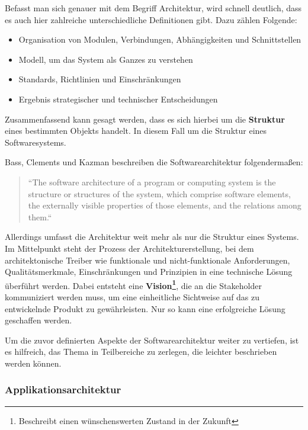 Befasst man sich genauer mit dem Begriff \glqq Architektur\grqq, wird schnell deutlich, dass es auch hier zahlreiche unterschiedliche Definitionen gibt. Dazu zählen Folgende:

\begin{itemize}
    \item Organisation von Modulen, Verbindungen, Abhängigkeiten und Schnittstellen
    \item Modell, um das System als Ganzes zu verstehen
    \item Standards, Richtlinien und Einschränkungen
    \item Ergebnis strategischer und technischer Entscheidungen
\end{itemize}

Zusammenfassend kann gesagt werden, dass es sich hierbei um die \textbf{Struktur} eines bestimmten Objekts handelt. In diesem Fall um die Struktur eines Softwaresystems. \cite{EA:Web01}

Bass, Clements und Kazman beschreiben die Softwarearchitektur folgendermaßen:

\begin{quote}
    ``The software architecture of a program or computing system is the structure or structures of the system, which comprise software elements, the externally visible properties of those elements, and the relations among them.`` \cite[S. 3]{EA:Book03}
\end{quote}

Allerdings umfasst die Architektur weit mehr als nur die Struktur eines Systems. 
Im Mittelpunkt steht der Prozess der Architekturerstellung, bei dem architektonische Treiber wie funktionale und nicht-funktionale Anforderungen, Qualitätsmerkmale, Einschränkungen und Prinzipien in eine technische Lösung überführt werden. Dabei entsteht eine \textbf{Vision\footnote{Beschreibt einen wünschenswerten Zustand in der Zukunft}}, die an die Stakeholder kommuniziert werden muss, um eine einheitliche Sichtweise auf das zu entwickelnde Produkt zu gewährleisten. Nur so kann eine erfolgreiche Lösung geschaffen werden.
\cite{EA:Web01}

\clearpage

Um die zuvor definierten Aspekte der Softwarearchitektur weiter zu vertiefen, ist es hilfreich, das Thema in Teilbereiche zu zerlegen, die leichter beschrieben werden können.



    \subsubsection{Applikationsarchitektur}

